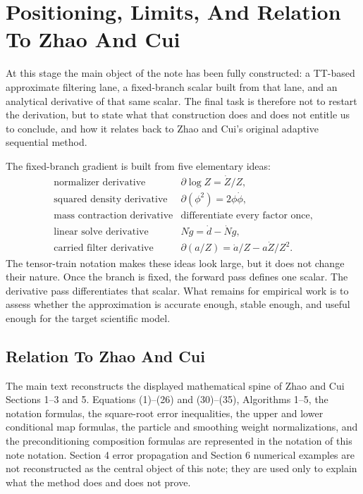 \documentclass[11pt]{article}
\numberwithin{equation}{section}
\begin{document}
\section{Positioning, Limits, And Relation To Zhao And Cui}

At this stage the main object of the note has been fully constructed: a TT-based
approximate filtering lane, a fixed-branch scalar built from that lane, and an
analytical derivative of that same scalar.  The final task is therefore not to
restart the derivation, but to state what that construction does and does not
entitle us to conclude, and how it relates back to Zhao and Cui's original
adaptive sequential method.

The fixed-branch gradient is built from five elementary ideas:
\begin{equation}
\begin{array}{ll}
\text{normalizer derivative} & \partial\log Z=\dot Z/Z,\\[2mm]
\text{squared density derivative} & \partial(\phi^2)=2\phi\dot\phi,\\[2mm]
\text{mass contraction derivative} & \text{differentiate every factor once},\\[2mm]
\text{linear solve derivative} & N\dot g=\dot d-\dot N g,\\[2mm]
\text{carried filter derivative} & \partial(a/Z)=\dot a/Z-a\dot Z/Z^2.
\end{array}
\label{eq:p24-p19-110}
\end{equation}
The tensor-train notation makes these ideas look large, but it does not change
their nature.  Once the branch is fixed, the forward pass defines one scalar.
The derivative pass differentiates that scalar.  What remains for empirical
work is to assess whether the approximation is accurate enough, stable enough,
and useful enough for the target scientific model.

\subsection{Relation To Zhao And Cui}

The main text reconstructs the displayed mathematical spine of Zhao and Cui \cite{zhao2024ttsequential}
Sections 1--3 and 5.  Equations (1)--(26) and (30)--(35), Algorithms 1--5,
the notation formulas, the square-root error inequalities, the upper and lower
conditional map formulas, the particle and smoothing weight normalizations, and
the preconditioning composition formulas are represented in the notation of this note
notation.  Section 4 error propagation and Section 6 numerical examples are
not reconstructed as the central object of this note; they are used only to
explain what the method does and does not prove.

\appendix


  {}
  {}
\end{document}
